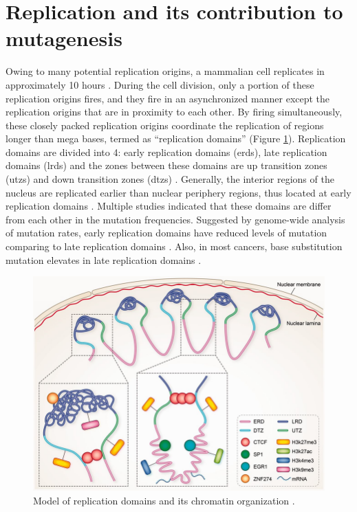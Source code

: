 \section{Replication and its contribution to mutagenesis}

Owing to many potential replication origins, a mammalian cell replicates in approximately 10 hours \citep{takebayashi2017anatomy}. During the cell division, only a portion of these replication origins fires, and they fire in an asynchronized manner except the replication origins that are in proximity to each other. By firing simultaneously, these closely packed replication origins coordinate the replication of regions longer than mega bases, termed as “replication domains” \citep{jackson1998replicon} (Figure \ref{fig:introrepdomains}). Replication domains are divided into 4: early replication domains (\gls{erd}s), late replication domains (\gls{lrd}s) and the zones between these domains are up transition zones (\gls{utz}s) and down transition zones (\gls{dtz}s) \citep{farkash2008global,hansen2010sequencing,hiratani2008global,koren2014genetic,nakayasu1989mapping,o1992dynamic}. Generally, the interior regions of the nucleus are replicated earlier than nuclear periphery regions, thus located at early replication domains \citep{dimitrova2002spatio}. Multiple studies indicated that these domains are differ from each other in the mutation frequencies. Suggested by genome-wide analysis of mutation rates, early replication domains have reduced levels of mutation comparing to late replication domains \citep{lawrence2013mutational,stamatoyannopoulos2009human}. Also, in most cancers, base substitution mutation elevates in late replication domains \citep{schuster2012chromatin}.

\shorthandoff{=}
\begin{figure}[H]
    \begin{center}
    \includegraphics[width=\textwidth]{Chapters/1_introduction/figures/repdomains}
    \caption{Model of replication domains and its chromatin organization \citep{liu2016novo}.}
    \label{fig:introrepdomains}
    \end{center}
    \end{figure}

